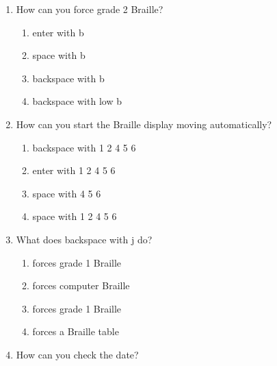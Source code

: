 \documentclass[10pt,letterpaper,twoside]{report}
\begin{document}
{{{{\begin{enumerate}
\begin{enumerate}
		      \item Enter i opens the User Guide index.
	      \end{enumerate}
	      
	\item How can you force grade 2 Braille?
	      
	      \begin{enumerate}
		      \item enter with b
		            
		      \item space with b
		            
		      \item backspace with b
		            
		      \item backspace with low b
		            
		            
	      \end{enumerate}
	\item How can you start the Braille display moving automatically?
	      
	      \begin{enumerate}
		      \item backspace with 1 2 4 5 6
		            
		      \item enter with 1 2 4 5 6
		            
		      \item space with 4 5 6
		            
		      \item space with 1 2 4 5 6
		            
		            
	      \end{enumerate}
	\item What does backspace with j do?
	      
	      \begin{enumerate}
		      \item forces grade 1 Braille
		            
		      \item forces computer Braille
		            
		      \item forces grade 1 Braille
		            
		      \item forces a Braille table
		            
		            
	      \end{enumerate}
	\item How can you check the date?
	      

\end{enumerate}}}}}
\end{document}
